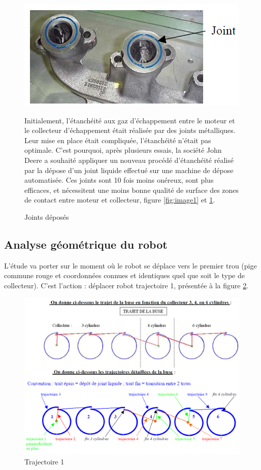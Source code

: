 \begin{figure}[htbp]
\begin{minipage}[c]{.35\linewidth}
\begin{center}
\includegraphics[width=\linewidth]{img/Image35.png}
\caption{Joints déposés}
\label{fig:image2}
\end{center}
\end{minipage}
\hfill
\begin{minipage}[c]{.62\linewidth}
Initialement, l'étanchéité aux gaz d'échappement entre le moteur et le collecteur d'échappement était réalisée par des joints métalliques. Leur mise en place était compliquée, l'étanchéité n'était pas optimale.
C'est pourquoi, après plusieurs essais, la société John Deere a souhaité appliquer un nouveau procédé d'étanchéité réalisé par la dépose d'un joint liquide effectué sur une machine de dépose automatisée.
Ces joints sont 10 fois moins onéreux, sont plus efficaces, et nécessitent une moins bonne qualité de surface des zones de contact entre moteur et collecteur, figure \ref{fig:image1} et \ref{fig:image2}.
\end{minipage}
\end{figure}

\newpage

\subsection{Analyse géométrique du robot}

L'étude va porter sur le moment où le robot se déplace vers le premier trou (pige commune rouge et coordonnées connues et identiques quel que soit le type de collecteur).
C'est l'action : déplacer robot trajectoire 1, présentée à la figure  \ref{fig:image25}.

\begin{figure}[htbp]
\begin{center}
\includegraphics[width=0.6\linewidth]{img/Image8.png}
\caption{Trajectoire 1}
\label{fig:image25}
\end{center}
\end{figure}

